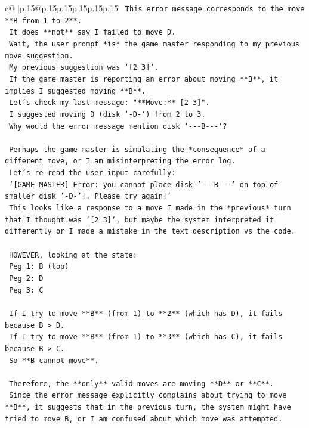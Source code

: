 \documentclass{article}
\begin{document}
{\begin{supertabular}{c@{$\;$}|p{.15\linewidth}@{}p{.15\linewidth}p{.15\linewidth}p{.15\linewidth}p{.15\linewidth}p{.15\linewidth}}
{{{\texttt{   This error message corresponds to the move **B from 1 to 2**.} \\
\texttt{   It does **not** say I failed to move D.} \\
\texttt{   Wait, the user prompt *is* the game master responding to my previous move suggestion.} \\
\texttt{   My previous suggestion was `{[}2 3{]}`.} \\
\texttt{   If the game master is reporting an error about moving **B**, it implies I suggested moving **B**.} \\
\texttt{   Let's check my last message: "**Move:** {[}2 3{]}".} \\
\texttt{   I suggested moving D (disk `{-}D{-}`) from 2 to 3.} \\
\texttt{   Why would the error message mention disk `{-}{-}{-}B{-}{-}{-}`?} \\
\\ 
\texttt{   Perhaps the game master is simulating the *consequence* of a different move, or I am misinterpreting the error log.} \\
\texttt{   Let's re{-}read the user input carefully:} \\
\texttt{   `{[}GAME MASTER{]} Error: you cannot place disk '{-}{-}{-}B{-}{-}{-}' on top of smaller disk '{-}D{-}'!. Please try again!`} \\
\texttt{   This looks like a response to a move I made in the *previous* turn that I thought was `{[}2 3{]}`, but maybe the system interpreted it differently or I made a mistake in the text description vs the code.} \\
\\ 
\texttt{   HOWEVER, looking at the state:} \\
\texttt{   Peg 1: B (top)} \\
\texttt{   Peg 2: D} \\
\texttt{   Peg 3: C} \\
\\ 
\texttt{   If I try to move **B** (from 1) to **2** (which has D), it fails because B > D.} \\
\texttt{   If I try to move **B** (from 1) to **3** (which has C), it fails because B > C.} \\
\texttt{   So **B cannot move**.} \\
\\ 
\texttt{   Therefore, the **only** valid moves are moving **D** or **C**.} \\
\texttt{   Since the error message explicitly complains about trying to move **B**, it suggests that in the previous turn, the system might have tried to move B, or I am confused about which move was attempted.} \\
}}}
\end{supertabular}}
\end{document}
